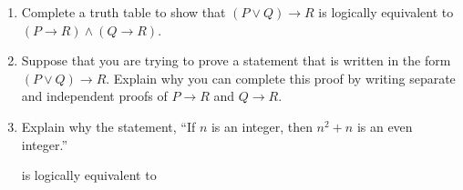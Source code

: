 %
\begin{previewactivity}\label{PA:alogicalequiv} \hfill
\begin{enumerate}

\item Complete a truth table to show that  $\left( {P \vee Q} \right) \to R$
  is logically equivalent to  $\left( {P \to R} \right) \wedge \left( {Q \to R} \right)$.
%
\item Suppose that you are trying to prove a statement that is written in the form  
$\left( {P \vee Q} \right) \to R$.  Explain why you can complete this proof by writing separate and independent proofs of   $P \to R$ and   $Q \to R$.

\item Explain why the statement, ``If  $n$  is an integer, then  $n^2  + n$ is an even integer.''

is logically equivalent to

\end{enumerate}
\end{previewactivity}
\hbreak
%
